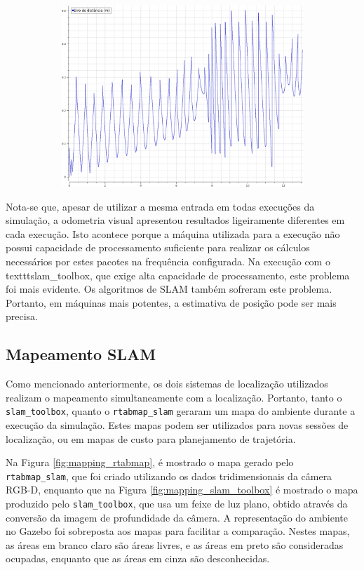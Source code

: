 \documentclass[repeatfields,xlists,xpacks,oneside,yearsonly]{ufrgscca}
\begin{document}
\begin{figure}[h]
\begin{subfigure}{0.5\linewidth}
{            \includegraphics[width=0.98\linewidth]{localization-slam-toolbox-error.png}\\
        }
    \end{subfigure}
\end{figure}

Nota-se que, apesar de utilizar a mesma entrada em todas execuções da
simulação, a odometria visual apresentou resultados ligeiramente
diferentes em cada execução. Isto acontece porque a máquina utilizada
para a execução não possui capacidade de processamento suficiente
para realizar os cálculos necessários por estes pacotes na frequência
configurada. Na execução com o texttt{slam\_toolbox}, que exige alta
capacidade de processamento, este problema foi mais evidente. Os
algoritmos de SLAM também sofreram este problema. Portanto, em
máquinas mais potentes, a estimativa de posição pode ser mais
precisa.

\subsection{Mapeamento SLAM}

Como mencionado anteriormente, os dois sistemas de localização
utilizados realizam o mapeamento simultaneamente com a localização.
Portanto, tanto o \texttt{slam\_toolbox}, quanto o
\texttt{rtabmap\_slam} geraram um mapa do ambiente durante a execução
da simulação. Estes mapas podem ser utilizados para novas sessões de
localização, ou em mapas de custo para planejamento de trajetória.

Na Figura \ref{fig:mapping_rtabmap}, é mostrado o mapa gerado pelo
\texttt{rtabmap\_slam}, que foi criado utilizando os dados
tridimensionais da câmera RGB-D, enquanto que na Figura
\ref{fig:mapping_slam_toolbox} é mostrado o mapa produzido pelo
\texttt{slam\_toolbox}, que usa um feixe de luz plano, obtido através
da conversão da imagem de profundidade da câmera. A representação do
ambiente no Gazebo foi sobreposta aos mapas para facilitar a
comparação. Nestes mapas, as áreas em branco claro são áreas livres,
e as áreas em preto são consideradas ocupadas, enquanto que as áreas
em cinza são desconhecidas.
\end{document}
